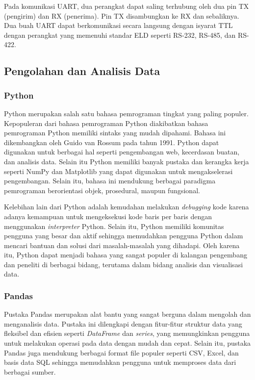 Pada komunikasi UART, dua perangkat dapat saling terhubung oleh dua pin TX (pengirim) dan RX (penerima). Pin TX disambungkan ke RX dan sebaliknya. Dua buah UART dapat berkomunikasi secara langsung dengan isyarat TTL dengan perangkat yang memenuhi standar ELD seperti RS-232, RS-485, dan RS-422.

\subsection{Pengolahan dan Analisis Data}

\subsubsection{Python}
Python merupakan salah satu bahasa pemrograman tingkat yang paling populer. Kepopuleran dari bahasa pemrograman Python diakibatkan bahasa pemrograman Python memiliki sintaks yang mudah dipahami. Bahasa ini dikembangkan oleh Guido van Rossum pada tahun 1991. Python dapat digunakan untuk berbagai hal seperti pengembangan web, kecerdasan buatan, dan analisis data. Selain itu Python memiliki banyak pustaka dan kerangka kerja seperti NumPy dan Matplotlib yang dapat digunakan untuk mengakselerasi pengembangan. Selain itu, bahasa ini mendukung berbagai paradigma pemrograman berorientasi objek, prosedural, maupun fungsional.

Kelebihan lain dari Python adalah kemudahan melakukan \textit{debugging} kode karena adanya kemampuan untuk mengeksekusi kode baris per baris dengan menggunakan \textit{interpreter} Python. Selain itu, Python memiliki komunitas pengguna yang besar dan aktif sehingga memudahkan pengguna Python dalam mencari bantuan dan solusi dari masalah-masalah yang dihadapi. Oleh karena itu, Python dapat menjadi bahasa yang sangat populer di kalangan pengembang dan peneliti di berbagai bidang, terutama dalam bidang analisis dan visualisasi data.

\subsubsection{Pandas}
Pustaka Pandas merupakan alat bantu yang sangat berguna dalam mengolah dan menganalisis data. Pustaka ini dilengkapi dengan fitur-fitur struktur data yang fleksibel dan efisien seperti \textit{DataFrame} dan \textit{series}, yang memungkinkan pengguna untuk melakukan operasi pada data dengan mudah dan cepat. Selain itu, pustaka Pandas juga mendukung berbagai format file populer seperti CSV, Excel, dan basis data SQL sehingga memudahkan pengguna untuk memproses data dari berbagai sumber.

